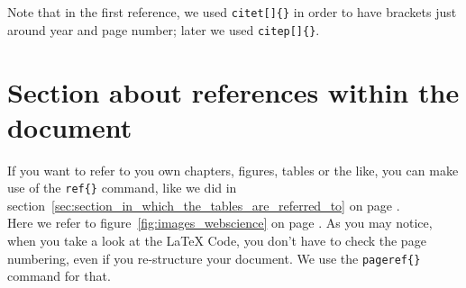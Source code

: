 Note that in the first reference, we used \texttt{citet[]\{\}} in order to have brackets just around year and page number; later we used \texttt{citep[]\{\}}.



\section{Section about references within the document} %
\label{sec:section_about_references_within_the_document}

If you want to refer to you own chapters, figures, tables or the like, you can make use of the \texttt{ref\{\}} command, like we did in section~\ref{sec:section_in_which_the_tables_are_referred_to} on page \pageref{sec:section_in_which_the_tables_are_referred_to}. \\

Here we refer to figure~\ref{fig:images_webscience} on page \pageref{fig:images_webscience}. As you may notice, when you take a look at the \LaTeX{} Code, you don't have to check the page numbering, even if you re-structure your document. We use the \texttt{pageref\{\}} command for that.








